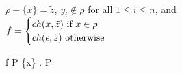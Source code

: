   {\begin{varwidth}{8cm}
    $\rho - \{x\} = \tilde{z}$, $y_i \notin \rho$ for all $1 \leq i \leq n$, and \\
    $ f =
      \begin{cases}
        ch(x, \tilde{z}) \text{ if } x \in \rho \\
        ch(\epsilon, \tilde{z}) \text{ otherwise }
      \end{cases} $
   \end{varwidth}}
  {\judgement
    {\rho}
    {f}
    {P}}
  {\judgement
    {\{x\} \cup {}}
    {}
    { . P}}
